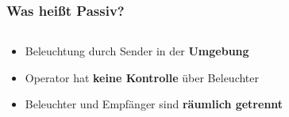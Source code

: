 \begin{frame}
    \frametitle{Was heißt Passiv?}

    \begin{columns}
        \begin{column}{0.6\textwidth}
            \begin{itemize}
                \item Beleuchtung durch Sender in der \textbf{Umgebung}
                \item Operator hat \textbf{keine Kontrolle} über Beleuchter
                \item Beleuchter und Empfänger sind \textbf{räumlich getrennt}
            \end{itemize}
        \end{column}
        \begin{column}{0.4\textwidth}
            \begin{figure}
                \centering
            \end{figure}
        \end{column}
    \end{columns}
\end{frame}

